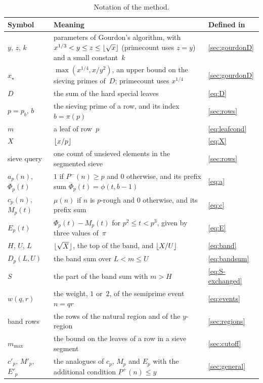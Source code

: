 \documentclass[11pt,a4paper]{amsart}
\numberwithin{equation}{section}
\DeclarePairedDelimiter{\floor}{\lfloor}{\rfloor}
\newcommand{\Pminus}{P^{-}}
\newcommand{\Pplus}{P^{+}}
\begin{document}
\begin{table}[htb]
\caption{Notation of the method.}\label{tab:symbols}
\centering
\begin{tabular}{@{}l>{\raggedright\arraybackslash}p{88mm}l@{}}
\toprule
Symbol & Meaning & Defined in\\
\midrule
$y$, $z$, $k$ & parameters of Gourdon's algorithm, with
  $x^{1/3}<y\le z\le\floor{\sqrt x}$ (primecount uses $z=y$) and a small
  constant~$k$ & \cref{sec:gourdonD}\\
$x_\star$ & $\max(x^{1/4},x/y^2)$, an upper bound on the sieving primes of~$D$;
  primecount uses $x^{1/4}$ & \cref{sec:gourdonD}\\
$D$ & the sum of the hard special leaves & \eqref{eq:D}\\
$p=p_b$, $b$ & the sieving prime of a row, and its index $b=\pi(p)$
  & \cref{sec:rows}\\
$m$ & a leaf of row~$p$ & \eqref{eq:leafcond}\\
$X$ & $\floor{x/p}$ & \eqref{eq:X}\\
sieve query & one count of unsieved elements in the segmented sieve
  & \cref{sec:rows}\\
$a_p(n)$, $\Phi_p(t)$ & $1$ if $\Pminus(n)\ge p$ and $0$ otherwise, and its
  prefix sum $\Phi_p(t)=\phi(t,b-1)$ & \eqref{eq:a}\\
$c_p(n)$, $M_p(t)$ & $\mu(n)$ if $n$ is $p$-rough and $0$ otherwise, and its
  prefix sum & \eqref{eq:c}\\
$E_p(t)$ & $\Phi_p(t)-M_p(t)$ for $p^2\le t<p^3$, given by three values
  of~$\pi$ & \eqref{eq:E}\\
$H$, $U$, $L$ & $\floor{\sqrt X}$, the top of the band, and $\floor{X/U}$
  & \eqref{eq:band}\\
$D_p(L,U)$ & the band sum over $L<m\le U$ & \eqref{eq:bandsum}\\
$S$ & the part of the band sum with $m>H$ & \eqref{eq:S-exchanged}\\
$w(q,r)$ & the weight, $1$ or~$2$, of the semiprime event $n=qr$
  & \eqref{eq:events}\\
band rows & the rows of the natural region and of the $y$-region
  & \cref{sec:regions}\\
$m_{\max}$ & the bound on the leaves of a row in a sieve segment
  & \cref{sec:cutoff}\\
$c'_p$, $M'_p$, $E'_p$ & the analogues of $c_p$, $M_p$ and $E_p$ with the
  additional condition $\Pplus(n)\le y$ & \cref{sec:general}\\
\bottomrule
\end{tabular}
\end{table}
\end{document}
